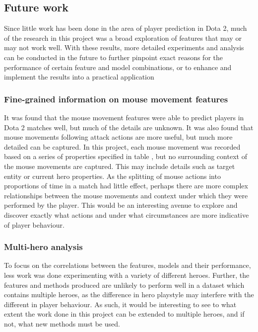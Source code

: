 \documentclass[Report.tex]{subfiles}
\begin{document}



\subsection{Future work}
Since little work has been done in the area of player prediction in Dota 2, much of the research in this project was a broad exploration of features that may or may not work well. With these results, more detailed experiments and analysis can be conducted in the future to further pinpoint exact reasons for the performance of certain feature and model combinations, or to enhance and implement the results into a practical application

\subsubsection{Fine-grained information on mouse movement features}
It was found that the mouse movement features were able to predict players in Dota 2 matches well, but much of the details are unknown. It was also found that mouse movements following attack actions are more useful, but much more detailed can be captured. In this project, each mouse movement was recorded based on a series of properties specified in table \label{tbl:mm-features}, but no surrounding context of the mouse movements are captured. This may include details such as target entity or current hero properties. As the splitting of mouse actions into proportions of time in a match had little effect, perhaps there are more complex relationships between the mouse movements and context under which they were performed by the player. This would be an interesting avenue to explore and discover exactly what actions and under what circumstances are more indicative of player behaviour. 

\subsubsection{Multi-hero analysis}
To focus on the correlations between the features, models and their performance, less work was done experimenting with a variety of different heroes. Further, the features and methods produced are unlikely to perform well in a dataset which contains multiple heroes, as the difference in hero playstyle may interfere with the different in player behaviour. As such, it would be interesting to see to what extent the work done in this project can be extended to multiple heroes, and if not, what new methods must be used. 
\end{document}
